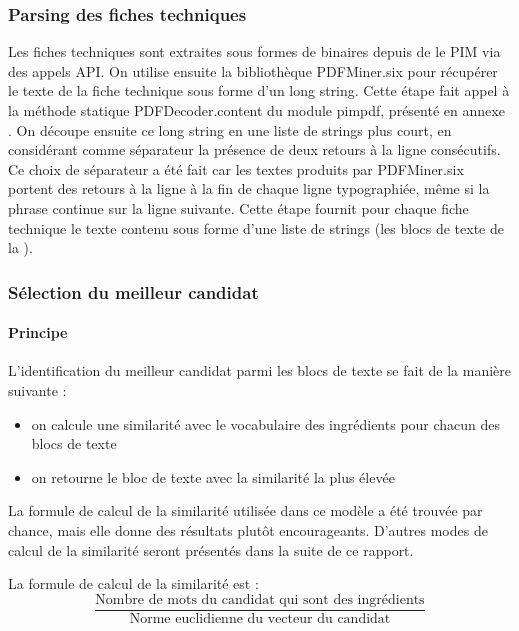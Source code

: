             \subsubsection{Parsing des fiches techniques}

                Les fiches techniques sont extraites sous formes de binaires depuis de le PIM via des appels API.
                On utilise ensuite la bibliothèque PDFMiner.six pour récupérer le texte de la fiche technique sous forme d'un long string.
                Cette étape fait appel à la méthode statique PDFDecoder.content du module pimpdf, présenté en annexe .
                On découpe ensuite ce long string en une liste de strings plus court, en considérant comme séparateur la présence de deux retours à la ligne consécutifs.
                Ce choix de séparateur a été fait car les textes produits par PDFMiner.six portent des retours à la ligne à la fin de chaque ligne typographiée, même si la phrase continue sur la ligne suivante.
                Cette étape fournit pour chaque fiche technique le texte contenu sous forme d'une liste de strings (les blocs de texte de la ).

            \subsubsection{Sélection du meilleur candidat}
            \label{open_model_similarity}

                \paragraph{Principe}
                L'identification du meilleur candidat parmi les blocs de texte se fait de la manière suivante :
                \begin{itemize}
                    \item on calcule une similarité avec le vocabulaire des ingrédients pour chacun des blocs de texte
                    \item on retourne le bloc de texte avec la similarité la plus élevée
                \end{itemize}
                La formule de calcul de la similarité utilisée dans ce modèle a été trouvée par chance, mais elle donne des résultats plutôt encourageants.
                D'autres modes de calcul de la similarité seront présentés dans la suite de ce rapport.

                La formule de calcul de la similarité est :
                \[\frac{\text{Nombre de mots du candidat qui sont des ingrédients}}{\text{Norme euclidienne du vecteur du candidat}}\]
                
